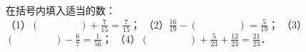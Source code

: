
在括号内填入适当的数：\\
（1）$(\hspace{4em})+\frac{7}{15}=\frac{7}{15}$；
（2）$\frac{16}{19}-(\hspace{4em})=\frac{5}{19}$；
（3）$(\hspace{4em})-\frac{6}{7}=\frac{1}{56}$；
（4）$(\hspace{4em})+\frac{5}{23}+\frac{12}{23}=\frac{21}{23}$．
